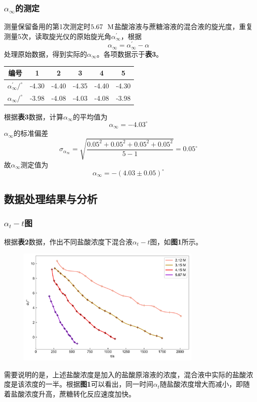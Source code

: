 \documentclass[12pt]{article}
\begin{document}
\subsubsection{$\alpha_{\infty}$的测定}
测量保留备用的第1次测定时$5.67\ \ {\rm M}$盐酸溶液与蔗糖溶液的混合液的旋光度，重复测量5次，读取旋光仪的原始旋光角$\alpha^{\prime}_{\infty}$，根据
$$
\alpha_{\infty}=\alpha^{\prime}_{\infty}-\alpha
$$
处理原始数据，得到实际的$\alpha_{\infty}$。各项数据示于\textbf{表3}。
\begin{table}[h]
	\centering
	\begin{tabular}{cccccc}
		\toprule
		编号 & 1 & 2 & 3 & 4 & 5 \\
		\midrule
		$\alpha^{\prime}_{\infty} / ^{\circ}$ & -4.30 & -4.40 & -4.35 & -4.40 & -4.30\\
				$\alpha_{\infty} / ^{\circ}$ & -3.98 & -4.08 & -4.03 & -4.08 & -3.98\\
		\bottomrule
	\end{tabular}
\end{table}
\par
 根据\textbf{表3}数据，计算$\alpha_{\infty}$的平均值为
 $$\alpha_{\infty}=-4.03^{\circ}
 $$
 $\alpha_{\infty}$的标准偏差
 $$
 \sigma_{\alpha_{\infty}}=\sqrt{\frac{0.05^{2}+0.05^{2}+0.05^{2}+0.05^{2}}{5-1}}=0.05^{\circ}
 $$
 故$\alpha_{\infty}$测定值为
 $$\alpha_{\infty}=-(4.03\pm 0.05)^{\circ}
 $$

 \subsection{数据处理结果与分析}
 \subsubsection{$\alpha_{t}-t$图}
 根据\textbf{表2}数据，作出不同盐酸浓度下混合液$\alpha_{t}-t$图，如\textbf{图1}所示。
 \begin{figure}[h]
 	\centering
 	\includegraphics[width=0.8\textwidth]{1.jpg}
 \end{figure}
 \par
 需要说明的是，上述盐酸浓度是加入的盐酸原溶液的浓度，混合液中实际的盐酸浓度是该浓度的一半。根据\textbf{图1}可以看出，同一时间$\alpha_{t}$随盐酸浓度增大而减小，即随着盐酸浓度升高，蔗糖转化反应速度加快。
\end{document}
